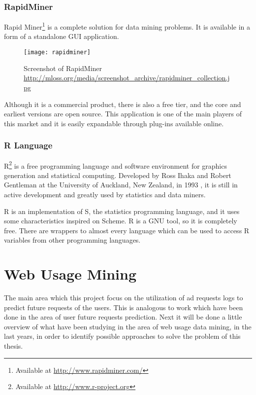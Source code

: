 \subsubsection{RapidMiner}

Rapid Miner\footnote{ Available at \url{http://www.rapidminer.com/}} is a complete solution for data mining problems. It is available in a form of
a standalone GUI application.
\begin{figure}[h]
  \begin{center}
    \leavevmode
    \texttt{[image: rapidminer]}
    \caption{Screenshot of RapidMiner \url{http://mloss.org/media/screenshot_archive/rapidminer_collection.jpg}}
    \label{fig:RapidMiner}
  \end{center}
\end{figure}

 Although it is a commercial product, there is also a free tier, and the core and earliest versions are open source. This application
is one of the main players of this market and it is easily expandable through plug-ins available online.

\subsubsection{R Language}
R\footnote{ Available at \url{http://www.r-project.org}} is a free programming language and software environment for graphics generation and statistical computing.
Developed by Ross Ihaka and Robert Gentleman at the University of Auckland, New Zealand, in 1993 \cite{Ihaka98r:past}, it is still in active development and
greatly used by statistics and data miners.

R is an implementation of S, the statistics programming language, and it uses some characteristics inspired on Scheme.
R is a GNU tool, so it is completely free. There are wrappers to almost every language which can be used to access R variables from other programming languages.


\section{Web Usage Mining}\label{sec:network}

The main area which this project focus on the utilization of ad requests logs
to predict future requests of the users. This is analogous to work
which have been done in the area of user future requests prediction.
Next it will be done a little overview of what have been studying in the area of web
usage data mining, in the last years, in order to identify possible approaches
to solve the problem of this thesis.


